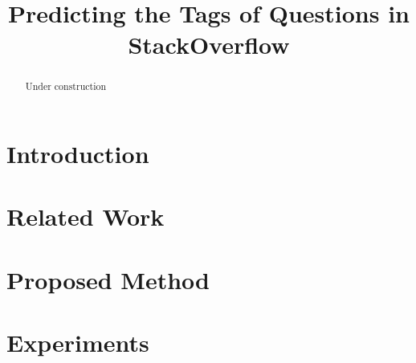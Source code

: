 \documentclass{article} %
\title{Predicting the Tags of Questions in StackOverflow}
\begin{document}
\maketitle

\begin{abstract}
Under construction
\end{abstract}

\section{Introduction}


\section{Related Work}


\section{Proposed Method}


\section{Experiments}


\small{


}
\end{document}
